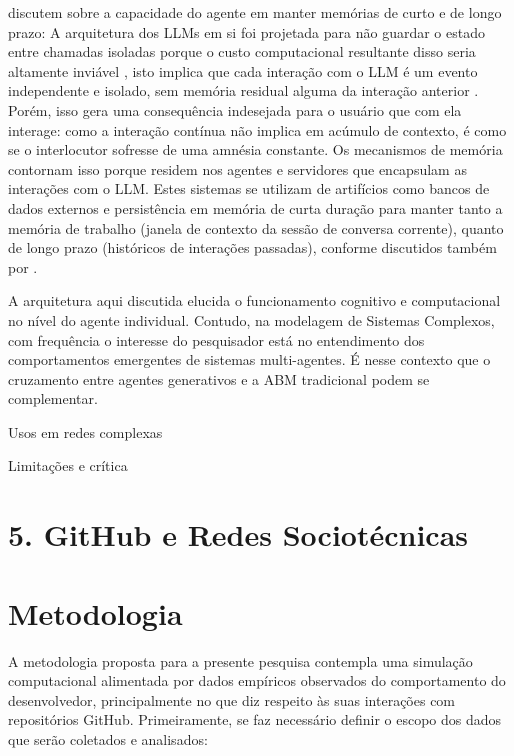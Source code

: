 \documentclass[12pt,oneside,a4paper,brazil,sumario=tradicional]{abntex2}
\begin{document}
\textcite{zhao2023} discutem sobre a capacidade do agente em manter memórias de curto e de longo prazo: A arquitetura dos LLMs em si foi projetada para não guardar o estado entre chamadas isoladas porque o custo computacional resultante disso seria altamente inviável \parencite{oren2024}, isto implica que cada interação com o LLM é um evento independente e isolado, sem memória residual alguma da interação anterior \parencite{tang2026}. Porém, isso gera uma consequência indesejada para o usuário que com ela interage: como a interação contínua não implica em acúmulo de contexto, é como se o interlocutor sofresse de uma amnésia constante. Os mecanismos de memória contornam isso porque residem nos agentes e servidores que encapsulam as interações com o LLM. Estes sistemas se utilizam de artifícios como bancos de dados externos e persistência em memória de curta duração para manter tanto a memória de trabalho (janela de contexto da sessão de conversa corrente), quanto de longo prazo (históricos de interações passadas), conforme discutidos também por \textcite{xu2026}.

A arquitetura aqui discutida elucida o funcionamento cognitivo e computacional no nível do agente individual. Contudo, na modelagem de Sistemas Complexos, com frequência o interesse do pesquisador está no entendimento dos comportamentos emergentes de sistemas multi-agentes. É nesse contexto que o cruzamento entre agentes generativos e a ABM tradicional podem se complementar.


Usos em redes complexas

Limitações e crítica

\section*{5. GitHub e Redes Sociotécnicas}

\section*{Metodologia}
A metodologia proposta para a presente pesquisa contempla uma simulação computacional alimentada por dados empíricos observados do comportamento do desenvolvedor, principalmente no que diz respeito às suas interações com repositórios GitHub.  Primeiramente, se faz necessário definir o escopo dos dados que serão coletados e analisados:
\end{document}
